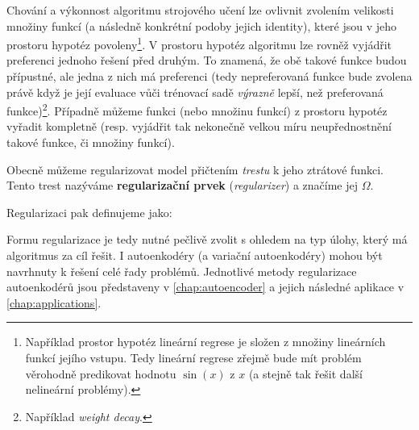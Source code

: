 Chování a výkonnost algoritmu strojového učení lze ovlivnit zvolením velikosti množiny funkcí (a následně konkrétní podoby jejich identity), které jsou v jeho prostoru hypotéz povoleny\footnote{Například prostor hypotéz lineární regrese je složen z množiny lineárních funkcí jejího vstupu. Tedy lineární regrese zřejmě bude mít problém věrohodně predikovat hodnotu $\sin(x)$ z $x$ (a stejně tak řešit další nelineární problémy).}.
V prostoru hypotéz algoritmu lze rovněž vyjádřit preferenci jednoho řešení před druhým.
To znamená, že obě takové funkce budou přípustné, ale jedna z nich má preferenci (tedy nepreferovaná funkce bude zvolena právě když je její evaluace vůči trénovací sadě \emph{výrazně} lepší, než preferovaná funkce)\footnote{Například \emph{weight decay}.}.
Případně můžeme funkci (nebo množinu funkcí) z prostoru hypotéz vyřadit kompletně (resp. vyjádřit tak nekonečně velkou míru neupřednostnění takové funkce, či množiny funkcí). \cite{Goodfellow2016}

Obecně můžeme regularizovat model přičtením \emph{trestu} k jeho ztrátové funkci. Tento trest nazýváme \textbf{regularizační prvek} (\emph{regularizer}) a značíme jej $\Omega$.

Regularizaci pak definujeme jako:
\begin{displayquote}
     \cite{Goodfellow2016}
\end{displayquote}

Formu regularizace je tedy nutné pečlivě zvolit s ohledem na typ úlohy, který má algoritmus za cíl řešit.
I autoenkodéry (a variační autoenkodéry) mohou být navrhnuty k řešení celé řady problémů. Jednotlivé metody regularizace autoenkodérů jsou představeny v \autoref{chap:autoencoder} a jejich následné aplikace v \autoref{chap:applications}.





